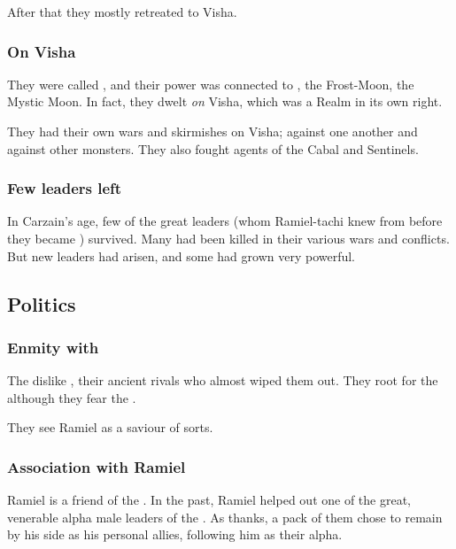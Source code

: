 After that they mostly retreated to Visha. 





\subsubsection{On Visha}
They were called , and their power was connected to , the Frost-Moon, the Mystic Moon. 
In fact, they dwelt \emph{on} Visha, which was a Realm in its own right. 

They had their own wars and skirmishes on Visha; against one another and against other monsters. 
They also fought agents of the Cabal and Sentinels. 





\subsubsection{Few leaders left}
In Carzain's age, few of the great \vorcanth{} leaders (whom Ramiel-tachi knew from before they became \malachim) survived. 
Many had been killed in their various wars and conflicts. 
But new leaders had arisen, and some had grown very powerful. 









\subsection{Politics}
\subsubsection{Enmity with \dragons}
The \moonwolves{} dislike \dragons, their ancient rivals who almost wiped them out. They root for the \resphain\dash although they fear the \banes. 

They see Ramiel as a saviour of sorts.





\subsubsection{Association with Ramiel}
Ramiel is a friend of the \MoonWolves{}. In the past, Ramiel helped out one of the great, venerable alpha male leaders of the \moonwolves. As thanks, a pack of them chose to remain by his side as his personal allies, following him as their alpha.

